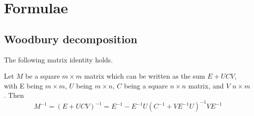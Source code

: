 \chapter{Formulae}
\section{Woodbury decomposition}
\label{sec:wood}
The following matrix identity holds.
\begin{proposition}
    Let $M$ be a square $m\times m$ matrix which can be written as the sum $E+UCV$, with E being $m \times m$, $U$ being $m\times n$, $C$ being a square $n\times n$ matrix, and $V$ $n\times m$. Then
    \begin{equation}
        \label{wood}
        M^{-1}=
        \left(E + UCV \right)^{-1} = E^{-1} - E^{-1}U\left(C^{-1} + V E^{-1}U\right)^{-1}V E^{-1}
    \end{equation}
\end{proposition}

